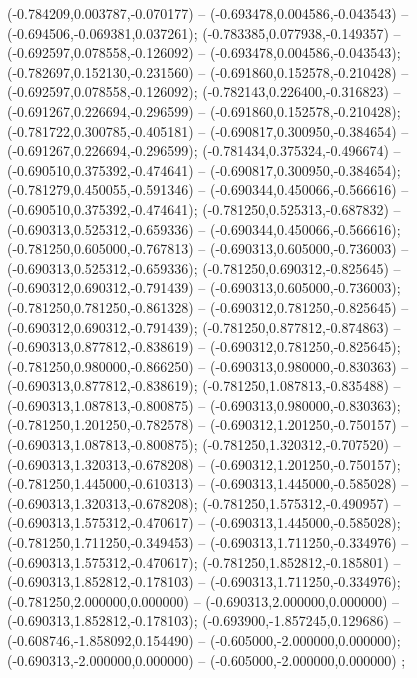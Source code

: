  (-0.784209,0.003787,-0.070177) -- (-0.693478,0.004586,-0.043543) -- (-0.694506,-0.069381,0.037261);
 (-0.783385,0.077938,-0.149357) -- (-0.692597,0.078558,-0.126092) -- (-0.693478,0.004586,-0.043543);
 (-0.782697,0.152130,-0.231560) -- (-0.691860,0.152578,-0.210428) -- (-0.692597,0.078558,-0.126092);
 (-0.782143,0.226400,-0.316823) -- (-0.691267,0.226694,-0.296599) -- (-0.691860,0.152578,-0.210428);
 (-0.781722,0.300785,-0.405181) -- (-0.690817,0.300950,-0.384654) -- (-0.691267,0.226694,-0.296599);
 (-0.781434,0.375324,-0.496674) -- (-0.690510,0.375392,-0.474641) -- (-0.690817,0.300950,-0.384654);
 (-0.781279,0.450055,-0.591346) -- (-0.690344,0.450066,-0.566616) -- (-0.690510,0.375392,-0.474641);
 (-0.781250,0.525313,-0.687832) -- (-0.690313,0.525312,-0.659336) -- (-0.690344,0.450066,-0.566616);
 (-0.781250,0.605000,-0.767813) -- (-0.690313,0.605000,-0.736003) -- (-0.690313,0.525312,-0.659336);
 (-0.781250,0.690312,-0.825645) -- (-0.690312,0.690312,-0.791439) -- (-0.690313,0.605000,-0.736003);
 (-0.781250,0.781250,-0.861328) -- (-0.690312,0.781250,-0.825645) -- (-0.690312,0.690312,-0.791439);
 (-0.781250,0.877812,-0.874863) -- (-0.690313,0.877812,-0.838619) -- (-0.690312,0.781250,-0.825645);
 (-0.781250,0.980000,-0.866250) -- (-0.690313,0.980000,-0.830363) -- (-0.690313,0.877812,-0.838619);
 (-0.781250,1.087813,-0.835488) -- (-0.690313,1.087813,-0.800875) -- (-0.690313,0.980000,-0.830363);
 (-0.781250,1.201250,-0.782578) -- (-0.690312,1.201250,-0.750157) -- (-0.690313,1.087813,-0.800875);
 (-0.781250,1.320312,-0.707520) -- (-0.690313,1.320313,-0.678208) -- (-0.690312,1.201250,-0.750157);
 (-0.781250,1.445000,-0.610313) -- (-0.690313,1.445000,-0.585028) -- (-0.690313,1.320313,-0.678208);
 (-0.781250,1.575312,-0.490957) -- (-0.690313,1.575312,-0.470617) -- (-0.690313,1.445000,-0.585028);
 (-0.781250,1.711250,-0.349453) -- (-0.690313,1.711250,-0.334976) -- (-0.690313,1.575312,-0.470617);
 (-0.781250,1.852812,-0.185801) -- (-0.690313,1.852812,-0.178103) -- (-0.690313,1.711250,-0.334976);
 (-0.781250,2.000000,0.000000) -- (-0.690313,2.000000,0.000000) -- (-0.690313,1.852812,-0.178103);
 (-0.693900,-1.857245,0.129686) -- (-0.608746,-1.858092,0.154490) -- (-0.605000,-2.000000,0.000000);
 (-0.690313,-2.000000,0.000000) -- (-0.605000,-2.000000,0.000000) ;
